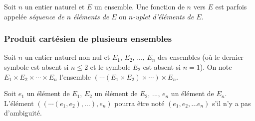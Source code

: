 Soit $n$ un entier naturel et $E$ un ensemble. 
Une fonction de $n$ vers $E$ est parfois appelée \textit{séquence de $n$ éléments de $E$} ou \textit{$n$-uplet d'éléments de $E$}.

\subsubsection{Produit cartésien de plusieurs ensembles}

Soit $n$ un entier naturel non nul et $E_1$, $E_2$, ..., $E_n$ des ensembles (où le dernier symbole est absent si $n \leq 2$ et le symbole $E_2$ est absent si $n = 1$). 
On note $E_1 \times E_2 \times \cdots \times E_n$ l'ensemble $( \cdots ( E_1 \times E_2 ) \times  \cdots ) \times E_n$.

Soit $e_1$ un élément de $E_1$, $E_2$ un élément de $E_2$, ..., $e_n$ un élément de $E_n$. 
L'élément $(( \cdots ( e_1, e_2 ), \dots ), e_n)$ pourra être noté $(e_1, e_2, \dots e_n)$ s'il n'y a pas d'ambiguité.
